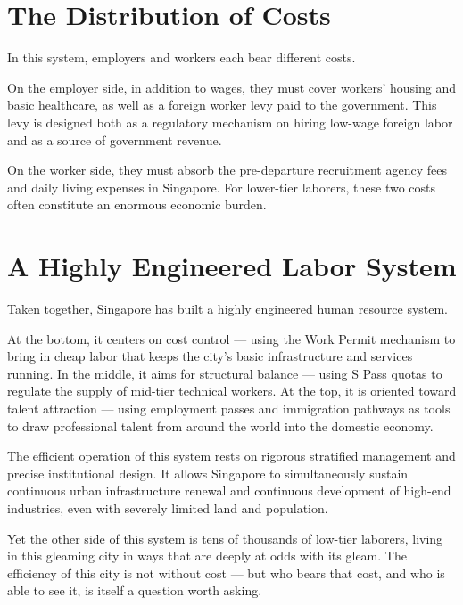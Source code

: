 \section{The Distribution of Costs}

In this system, employers and workers each bear different costs.

On the employer side, in addition to wages, they must cover workers' housing and basic healthcare, as well as a foreign worker levy paid to the government. This levy is designed both as a regulatory mechanism on hiring low-wage foreign labor and as a source of government revenue.

On the worker side, they must absorb the pre-departure recruitment agency fees and daily living expenses in Singapore. For lower-tier laborers, these two costs often constitute an enormous economic burden.

\section{A Highly Engineered Labor System}

Taken together, Singapore has built a highly engineered human resource system.

At the bottom, it centers on cost control --- using the Work Permit mechanism to bring in cheap labor that keeps the city's basic infrastructure and services running. In the middle, it aims for structural balance --- using S Pass quotas to regulate the supply of mid-tier technical workers. At the top, it is oriented toward talent attraction --- using employment passes and immigration pathways as tools to draw professional talent from around the world into the domestic economy.

The efficient operation of this system rests on rigorous stratified management and precise institutional design. It allows Singapore to simultaneously sustain continuous urban infrastructure renewal and continuous development of high-end industries, even with severely limited land and population.

Yet the other side of this system is tens of thousands of low-tier laborers, living in this gleaming city in ways that are deeply at odds with its gleam. The efficiency of this city is not without cost --- but who bears that cost, and who is able to see it, is itself a question worth asking.
